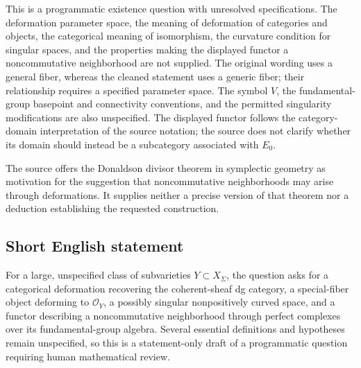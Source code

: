 \documentclass[11pt]{article}
\begin{document}
This is a programmatic existence question with unresolved specifications. The deformation parameter space, the meaning of deformation of categories and objects, the categorical meaning of isomorphism, the curvature condition for singular spaces, and the properties making the displayed functor a noncommutative neighborhood are not supplied. The original wording uses a general fiber, whereas the cleaned statement uses a generic fiber; their relationship requires a specified parameter space. The symbol \(V\), the fundamental-group basepoint and connectivity conventions, and the permitted singularity modifications are also unspecified. The displayed functor follows the category-domain interpretation of the source notation; the source does not clarify whether its domain should instead be a subcategory associated with \(E_0\).

The source offers the Donaldson divisor theorem in symplectic geometry as motivation for the suggestion that noncommutative neighborhoods may arise through deformations. It supplies neither a precise version of that theorem nor a deduction establishing the requested construction.
\subsection{Short English statement}
For a large, unspecified class of subvarieties \(Y\subset X_\Sigma\), the question asks for a categorical deformation recovering the coherent-sheaf dg category, a special-fiber object deforming to \(\mathcal O_Y\), a possibly singular nonpositively curved space, and a functor describing a noncommutative neighborhood through perfect complexes over its fundamental-group algebra. Several essential definitions and hypotheses remain unspecified, so this is a statement-only draft of a programmatic question requiring human mathematical review.
\end{document}
